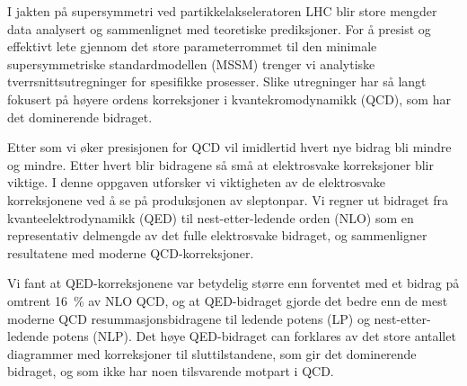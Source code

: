 \documentclass[USenglish]{uiotemp/uiomasterthesis}
\begin{document}
\begin{otherlanguage}{norwegian}
\begin{xabstract}[Sammendrag]
    I jakten på supersymmetri ved partikkelakseleratoren LHC blir store mengder data analysert og sammenlignet med teoretiske prediksjoner.
    For å presist og effektivt lete gjennom det store parameterrommet til den minimale supersymmetriske standardmodellen (MSSM) trenger vi analytiske tverrsnittsutregninger for spesifikke prosesser.
    Slike utregninger har så langt fokusert på høyere ordens korreksjoner i kvantekromodynamikk (QCD), som har det dominerende bidraget.

    Etter som vi øker presisjonen for QCD vil imidlertid hvert nye bidrag bli mindre og mindre.
    Etter hvert blir bidragene så små at elektrosvake korreksjoner blir viktige.
    I denne oppgaven utforsker vi viktigheten av de elektrosvake korreksjonene ved å se på produksjonen av sleptonpar.
    Vi regner ut bidraget fra kvanteelektrodynamikk (QED) til nest-etter-ledende orden (NLO) som en representativ delmengde av det fulle elektrosvake bidraget, og sammenligner resultatene med moderne QCD-korreksjoner.

    Vi fant at QED-korreksjonene var betydelig større enn forventet med et bidrag på omtrent \qty{16}{\percent} av NLO QCD, og at QED-bidraget gjorde det bedre enn de mest moderne QCD resummasjonsbidragene til ledende potens (LP) og nest-etter-ledende potens (NLP).
    Det høye QED-bidraget can forklares av det store antallet diagrammer med korreksjoner til sluttilstandene, som gir det dominerende bidraget, og som ikke har noen tilsvarende motpart i QCD.
\end{xabstract}
\end{otherlanguage}



\cleardoublepage
\tableofcontents
\cleardoublepage
{}
\listoffigures
{}
\cleardoublepage
{}
\listoftables
{}

\printglossary[
    type=\acronymtype,
    title=List of Abbreviations,
]

\mainmatter %

\glsresetall %



\glsresetall


\glsresetall



\glsresetall


\glsresetall


\glsresetall


\glsresetall


\appendix
\appendixpage

\glsresetall





\end{document}
